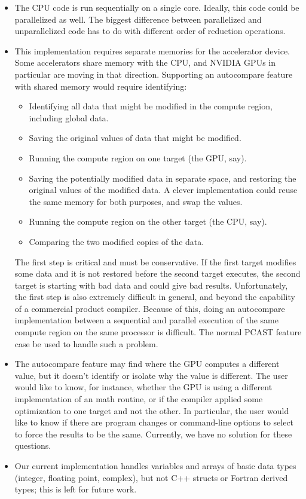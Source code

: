 \begin{itemize}
\item The CPU code is run sequentially on a single core.
Ideally, this code could be parallelized as well.
The biggest difference between parallelized and unparallelized code has to do with different order of reduction operations.
\item This implementation requires separate memories for the accelerator device.
Some accelerators share memory with the CPU, and NVIDIA GPUs in particular are moving in that direction.
Supporting an autocompare feature with shared memory would require identifying:
\begin{itemize}
\item Identifying all data that might be modified in the compute region, including global data.
\item Saving the original values of data that might be modified.
\item Running the compute region on one target (the GPU, say).
\item Saving the potentially modified data in separate space, and restoring the original values of the modified data.
A clever implementation could reuse the same memory for both purposes, and swap the values.
\item Running the compute region on the other target (the CPU, say).
\item Comparing the two modified copies of the data.
\end{itemize}
The first step is critical and must be conservative.
If the first target modifies some data and it is not restored before the second target executes, the second target is starting with bad data and could give bad results.
Unfortunately, the first step is also extremely difficult in general, and beyond the capability of a commercial product compiler.
Because of this, doing an autocompare implementation between a sequential and parallel execution of the same compute region on the same processor is difficult.
The normal PCAST feature case be used to handle such a problem.
\item The autocompare feature may find where the GPU computes a different value, but it doesn't identify or isolate why the value is different.
The user would like to know, for instance, whether the GPU is using a different implementation of an math routine, or if the compiler applied some optimization to one target and not the other.
In particular, the user would like to know if there are program changes or command-line options to select to force the results to be the same.
Currently, we have no solution for these questions.
\item Our current implementation handles variables and arrays of basic data types (integer, floating point, complex), but not C++ structs or Fortran derived types; this is left for future work.
\end{itemize}

